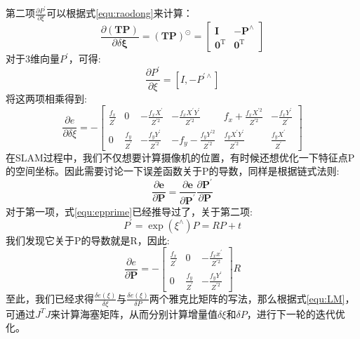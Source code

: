 第二项$\frac{\partial P^{\prime}}{\partial \xi}$可以根据式\ref{equ:raodong}来计算：
\begin{equation}
\frac{\partial(\boldsymbol{T} \boldsymbol{P})}{\partial \delta \boldsymbol{\xi}}=(\boldsymbol{T} \boldsymbol{P})^{\odot}=\left[ \begin{array}{cc}{\boldsymbol{I}} & {-\boldsymbol{P}}^{\wedge} \\ {\mathbf{0}^{\mathrm{T}}} & {\mathbf{0}^{\mathrm{T}}}\end{array}\right]
\end{equation}
对于3维向量$P^{\prime}$，可得:
\begin{equation}
\frac{\partial P^{\prime}}{\partial \xi}=\left[I,-P^{\prime \wedge}\right]
\end{equation}
将这两项相乘得到:
\begin{equation}
\frac{\partial e}{\partial \delta \xi}=-\left[ \begin{array}{cccccc}{\frac{f_{x}}{Z^{\prime}}} & {0} & {-\frac{f_{x} X^{\prime}}{Z^{\prime 2}}} & {-\frac{f_{x} X^{\prime} Y^{\prime}}{Z^{\prime 2}}} & {f_{x}+\frac{f_{x} X^{\prime 2}}{Z^{\prime 2}}} & {-\frac{f_{x} Y^{\prime}}{Z^{\prime}}} \\ {0} & {\frac{f_{y}}{Z^{\prime}}} & {-\frac{f_{y} Y^{\prime}}{Z^{\prime 2}}} & {-f_{y}-\frac{f_{y} Y^{\prime 2}}{Z^{\prime 2}}} & {\frac{f_{y} X^{\prime} Y^{\prime}}{Z^{\prime 2}}} & {\frac{f_{y} X^{\prime}}{Z^{\prime}}}\end{array}\right]
\end{equation}
在SLAM过程中，我们不仅想要计算摄像机的位置，有时候还想优化一下特征点P的空间坐标。因此需要讨论一下误差函数关于P的导数，同样是根据链式法则:
\begin{equation}
\frac{\partial \boldsymbol{e}}{\partial \boldsymbol{P}}=\frac{\partial \boldsymbol{e}}{\partial \boldsymbol{P}^{\prime}} \frac{\partial \boldsymbol{P}^{\prime}}{\partial \boldsymbol{P}}
\end{equation}
对于第一项，式\ref{equ:epprime}已经推导过了，关于第二项:
\begin{equation}
P^{\prime}=\exp \left(\xi^{\wedge}\right) P=R P+t
\end{equation}
我们发现它关于P的导数就是R，因此:
\begin{equation}
\frac{\partial e}{\partial \boldsymbol{P}}
=-\left[ \begin{array}{ccc}{\frac{f_{x}}{Z^{\prime}}} & {0} & {-\frac{f_{x} x^{\prime}}{Z^{\prime 2}}} \\ {0} & {\frac{f_{y}}{Z^{\prime}}} & {-\frac{f_{y} Y^{\prime}}{Z^{\prime 2}}}\end{array}\right] R
\end{equation}
至此，我们已经求得$\frac{\delta e(\xi)}{\delta \xi}$与$\frac{\delta e(\xi)}{\delta P}$两个雅克比矩阵的写法，那么根据式\ref{equ:LM}，可通过$J^TJ$来计算海塞矩阵，从而分别计算增量值$\delta \xi$和$\delta P$，进行下一轮的迭代优化。
